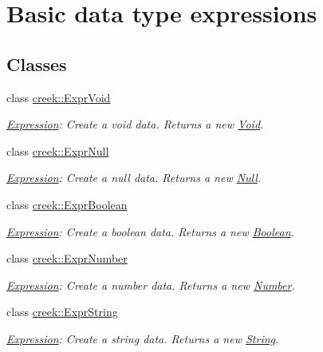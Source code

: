 \hypertarget{group__expression__data}{}\section{Basic data type expressions}
\label{group__expression__data}
\subsection*{Classes}
\begin{DoxyCompactItemize}
\item 
class \hyperlink{classcreek_1_1_expr_void}{creek\+::\+Expr\+Void}
\begin{DoxyCompactList}\small\item\em \hyperlink{classcreek_1_1_expression}{Expression}\+: Create a void data. Returns a new {\ttfamily \hyperlink{classcreek_1_1_void}{Void}}. \end{DoxyCompactList}\item 
class \hyperlink{classcreek_1_1_expr_null}{creek\+::\+Expr\+Null}
\begin{DoxyCompactList}\small\item\em \hyperlink{classcreek_1_1_expression}{Expression}\+: Create a null data. Returns a new {\ttfamily \hyperlink{classcreek_1_1_null}{Null}}. \end{DoxyCompactList}\item 
class \hyperlink{classcreek_1_1_expr_boolean}{creek\+::\+Expr\+Boolean}
\begin{DoxyCompactList}\small\item\em \hyperlink{classcreek_1_1_expression}{Expression}\+: Create a boolean data. Returns a new {\ttfamily \hyperlink{classcreek_1_1_boolean}{Boolean}}. \end{DoxyCompactList}\item 
class \hyperlink{classcreek_1_1_expr_number}{creek\+::\+Expr\+Number}
\begin{DoxyCompactList}\small\item\em \hyperlink{classcreek_1_1_expression}{Expression}\+: Create a number data. Returns a new {\ttfamily \hyperlink{classcreek_1_1_number}{Number}}. \end{DoxyCompactList}\item 
class \hyperlink{classcreek_1_1_expr_string}{creek\+::\+Expr\+String}
\begin{DoxyCompactList}\small\item\em \hyperlink{classcreek_1_1_expression}{Expression}\+: Create a string data. Returns a new {\ttfamily \hyperlink{classcreek_1_1_string}{String}}. \end{DoxyCompactList}\item 

\end{DoxyCompactItemize}
